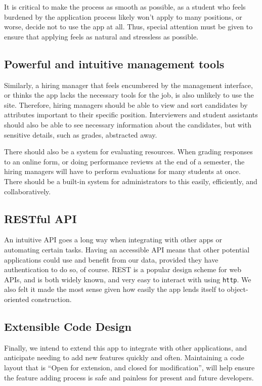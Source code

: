 It is critical to make the process as smooth as possible, as a student who feels burdened by the application process likely won't apply to many positions, or worse, decide not to use the app at all. Thus, special attention must be given to ensure that applying feels as natural and stressless as possible.

\subsection{Powerful and intuitive management tools}

Similarly, a hiring manager that feels encumbered by the management interface, or thinks the app lacks the necessary tools for the job, is also unlikely to use the site. Therefore, hiring managers should be able to view and sort candidates by attributes important to their specific position. Interviewers and student assistants should also be able to see necessary information about the candidates, but with sensitive details, such as grades, abstracted away.

There should also be a system for evaluating resources. When grading responses to an online form, or doing performance reviews at the end of a semester, the hiring managers will have to perform evaluations for many students at once. There should be a built-in system for administrators to this easily, efficiently, and collaboratively.

\subsection{RESTful API}

An intuitive API goes a long way when integrating with other apps or automating certain tasks. Having an accessible API means that other potential applications could use and benefit from our data, provided they have authentication to do so, of course. REST \cite{REST} is a popular design scheme for web APIs, and is both widely known, and very easy to interact with using \texttt{http}. We also felt it made the most sense given how easily the app lends itself to object-oriented construction.

\subsection{Extensible Code Design}

Finally, we intend to extend this app to integrate with other applications, and anticipate needing to add new features quickly and often. Maintaining a code layout that is ``Open for extension, and closed for modification'', will help ensure the feature adding process is safe and painless for present and future developers.

